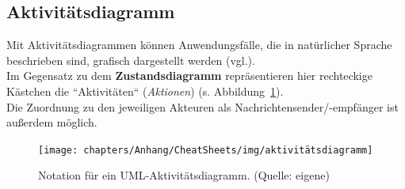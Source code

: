 \subsection*{Aktivitätsdiagramm}
Mit Aktivitätsdiagrammen können Anwendungsfälle, die in natürlicher Sprache beschrieben sind, grafisch dargestellt werden (vgl.\cite[304 ff.]{Oes05}).\\
Im Gegensatz zu dem \textbf{Zustandsdiagramm} repräsentieren hier rechteckige Kästchen die ``Aktivitäten`` (\textit{Aktionen}) (s. Abbildung~\ref{fig:aktivitätsdiagramm}).\\
Die Zuordnung zu den jeweiligen Akteuren als Nachrichtensender/-empfänger ist außerdem möglich.


\begin{figure}
    \centering
    \texttt{[image: chapters/Anhang/CheatSheets/img/aktivitätsdiagramm]}
    \caption{Notation für ein UML-Aktivitätsdiagramm. (Quelle: eigene)}
    \label{fig:aktivitätsdiagramm}
\end{figure}
